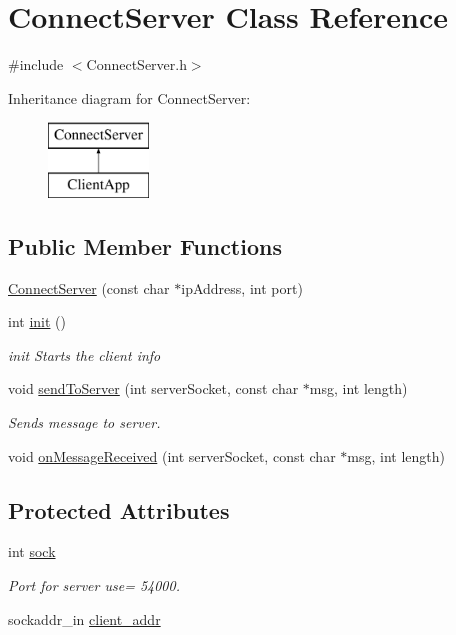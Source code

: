 \hypertarget{class_connect_server}{}\section{Connect\+Server Class Reference}
\label{class_connect_server}


{\ttfamily \#include $<$Connect\+Server.\+h$>$}

Inheritance diagram for Connect\+Server\+:\begin{figure}[H]
\begin{center}
\leavevmode
\includegraphics[height=2.000000cm]{class_connect_server}
\end{center}
\end{figure}
\subsection*{Public Member Functions}
\begin{DoxyCompactItemize}
\item 
\hyperlink{class_connect_server_afe4d34d8bb8bbefa91a8429643d5425f}{Connect\+Server} (const char $\ast$ip\+Address, int port)
\item 
int \hyperlink{class_connect_server_ac98881bc8b73d8807841dd930b19d1d4}{init} ()
\begin{DoxyCompactList}\small\item\em init Starts the client info \end{DoxyCompactList}\item 
void \hyperlink{class_connect_server_a618d975393a5d2c5f81248d69746693f}{send\+To\+Server} (int server\+Socket, const char $\ast$msg, int length)
\begin{DoxyCompactList}\small\item\em Sends message to server. \end{DoxyCompactList}\item 
void \hyperlink{class_connect_server_ab355aa727f730f92aa9ef946933b1a76}{on\+Message\+Received} (int server\+Socket, const char $\ast$msg, int length)
\end{DoxyCompactItemize}
\subsection*{Protected Attributes}
\begin{DoxyCompactItemize}
\item 
int \hyperlink{class_connect_server_ace72614112a76ddb8e7c549a7d66d57f}{sock}
\begin{DoxyCompactList}\small\item\em Port for server use= 54000. \end{DoxyCompactList}\item 
sockaddr\+\_\+in \hyperlink{class_connect_server_ab24487ababb0a449c7f4874f3fa2e218}{client\+\_\+addr}
\end{DoxyCompactItemize}


